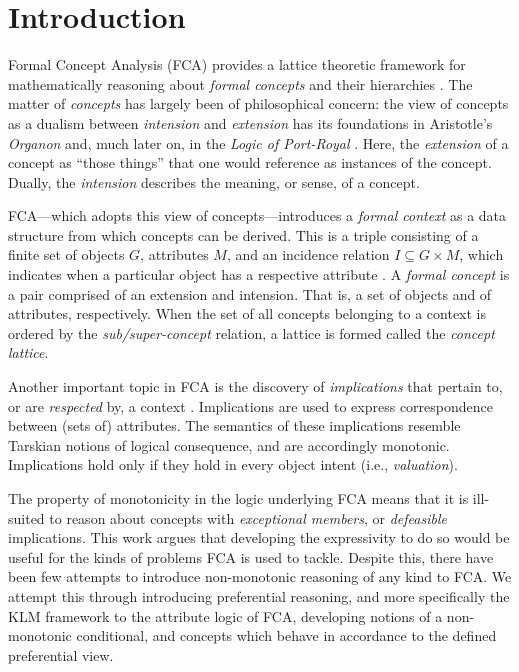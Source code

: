 \section{Introduction}
\label{section: introduction}

Formal Concept Analysis (FCA) provides a lattice theoretic framework for mathematically reasoning about \textit{formal concepts} and their hierarchies \cite{ganter1999formal,ganter2016conceptual}. The matter of \textit{concepts} has largely been of philosophical concern: the view of concepts as a dualism between \textit{intension} and \textit{extension} has its foundations in Aristotle's \textit{Organon} and, much later on, in the \textit{Logic of Port-Royal} \cite{rudolph2007relational,castonguay2012meaning}. Here, the \textit{extension} of a concept as ``those things'' that one would reference as instances of the concept. Dually, the \textit{intension} describes the meaning, or sense, of a concept.

FCA—which adopts this view of concepts—introduces a \textit{formal context} as a data structure from which concepts can be derived. This is a triple consisting of a finite set of objects $G$, attributes $M$, and an incidence relation $I \subseteq G\times M$, which indicates when a particular object has a respective attribute \cite{ganter1999formal,ganter2016conceptual}. A \textit{formal concept} is a pair comprised of an extension and intension. That is, a set of objects and of attributes, respectively. When the set of all concepts belonging to a context is ordered by the \textit{sub/super-concept} relation, a lattice is formed called the \textit{concept lattice}.

Another important topic in FCA is the discovery of \textit{implications} that pertain to, or are \textit{respected} by, a context \cite{rudolph2007relational,ganter1999formal}. Implications are used to express correspondence between (sets of) attributes. The semantics of these implications resemble Tarskian notions of logical consequence, and are accordingly monotonic. Implications hold only if they hold in every object intent (i.e., \textit{valuation}).

The property of monotonicity in the logic underlying FCA means that it is ill-suited to reason about concepts with \textit{exceptional members}, or \textit{defeasible} implications. This work argues that developing the expressivity to do so would be useful for the kinds of problems FCA is used to tackle. Despite this, there have been few attempts to introduce non-monotonic reasoning of any kind to FCA. We attempt this through introducing preferential reasoning, and more specifically the KLM framework to the attribute logic of FCA, developing notions of a non-monotonic conditional, and concepts which behave in accordance to the defined preferential view.

